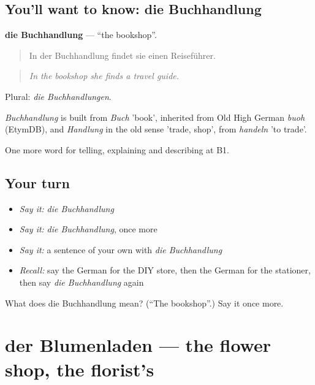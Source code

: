 \subsection*{You'll want to know: die Buchhandlung}
\textbf{die Buchhandlung} — \textquotedblleft{}the bookshop\textquotedblright{}.

\begin{quote}
In der Buchhandlung findet sie einen Reiseführer.
\end{quote}

\begin{quote}
\emph{In the bookshop she finds a travel guide.}
\end{quote}

Plural: \emph{die Buchhandlungen}.

\begin{cousinweb}
\emph{Buchhandlung} is built from \emph{Buch} 'book', inherited from Old High German \emph{buoh} (EtymDB), and \emph{Handlung} in the old sense 'trade, shop', from \emph{handeln} 'to trade'.
\end{cousinweb}

\begin{grammarlens}[title={What you've built}]
One more word for telling, explaining and describing at B1.
\end{grammarlens}

\subsection*{Your turn}
\begin{itemize}
\raggedright
  \item \emph{Say it:} \emph{die Buchhandlung}
  \item \emph{Say it:} \emph{die Buchhandlung}, once more
  \item \emph{Say it:} a sentence of your own with \emph{die Buchhandlung}
  \item \emph{Recall:} say the German for the DIY store, then the German for the stationer, then say \emph{die Buchhandlung} again
\end{itemize}

\begin{tcolorbox}[breakable,colback=teal!4,colframe=teal!35!black,title={Before you move on}]
What does die Buchhandlung mean? (\textquotedblleft{}The bookshop\textquotedblright{}.) Say it once more.
\end{tcolorbox}
\section[der Blumenladen]{der Blumenladen — the flower shop, the florist's}

